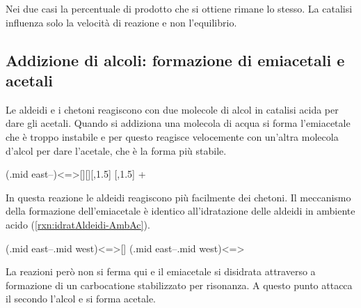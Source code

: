 Nei due casi la percentuale di prodotto che si ottiene rimane lo stesso. La catalisi influenza solo la velocità di reazione e non l'equilibrio.


\subsection{Addizione di alcoli: formazione di emiacetali e acetali}\label{sec:formazioneEmiacetali}
Le aldeidi e i chetoni reagiscono con due molecole di alcol in catalisi acida per dare gli acetali. Quando si addiziona una molecola di acqua si forma l'emiacetale che è troppo instabile e per questo reagisce velocemente con un'altra molecola d'alcol per dare l'acetale, che è la forma più stabile.
\begin{reaction}
	\arrow(.mid east--){<=>[][]}[,1.5]
	[,1.5]
	 + 
\end{reaction}

In questa reazione le aldeidi reagiscono più facilmente dei chetoni. Il meccanismo della formazione dell'emiacetale è identico all'idratazione delle aldeidi in ambiente acido (\autoref{rxn:idratAldeidi-AmbAc}).
\begingroup
{}
\begin{reaction}
	\arrow(.mid east--.mid west){<=>[]}
	\arrow{<=>[\chemfig{R-@{OH}\charge{90=\:,270=\:}{O}H}]}
	\arrow(.mid east--.mid west){<=>}
\end{reaction}
\endgroup
La reazioni però non si ferma qui e il emiacetale si disidrata attraverso a formazione di un carbocatione stabilizzato per risonanza. A questo punto attacca il secondo l'alcol e si forma acetale.

